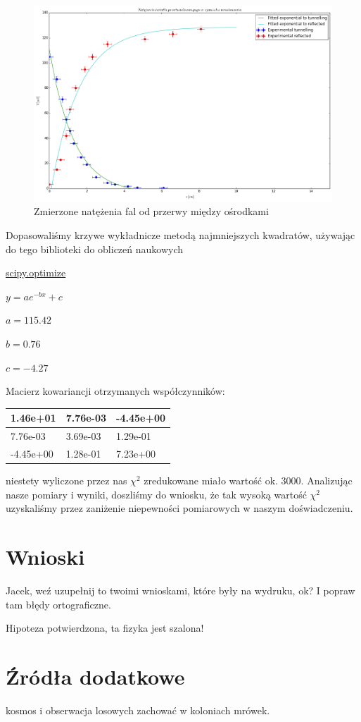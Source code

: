 \documentclass[a4paper,12pt]{article}
\begin{document}
\begin{figure} [H]
  \begin{center}
    \includegraphics[width = 15cm]{prettier_plot.png}
    \caption{Zmierzone natężenia fal od przerwy między ośrodkami}
  \end{center}
\end{figure}

Dopasowaliśmy krzywe wykładnicze metodą najmniejszych kwadratów, używając do tego biblioteki do obliczeń naukowych 

\href{'http://docs.scipy.org/doc/scipy/reference/tutorial/optimize.html'}{scipy.optimize}


$y = a e^{-bx} + c$

$a = 115.42$

$b = 0.76$

$c = -4.27 $


Macierz kowariancji otrzymanych współczynników:

\begin{center}

    \begin{tabular}{ | m{5cm}| m{5cm} | m{5cm} |} \hline
    
    
    1.46e+01  &   7.76e-03 & -4.45e+00 \\ \hline

 	7.76e-03  & 3.69e-03  & 1.29e-01 \\ \hline
    
    -4.45e+00 &  1.28e-01 &  7.23e+00 \\ \hline
    \end{tabular}
\end{center}


niestety wyliczone przez nas $\chi^2$ zredukowane miało wartość ok. 3000. Analizując nasze pomiary i wyniki, doszliśmy do wniosku, że tak wysoką wartość $\chi^2$ uzyskaliśmy przez zaniżenie niepewności pomiarowych w naszym doświadczeniu.


\section{Wnioski}

Jacek, weź uzupełnij to twoimi wnioskami, które były na wydruku, ok? I popraw tam błędy ortograficzne.

{\Large Hipoteza potwierdzona, ta fizyka jest szalona! }

\section {Źródła dodatkowe}
  
 kosmos i obserwacja losowych zachować w koloniach mrówek. 
\end{document}
